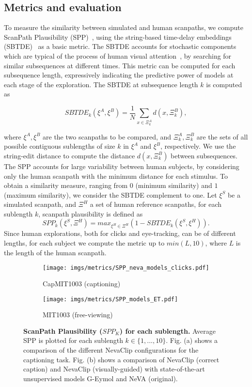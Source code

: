 \documentclass{article}
\begin{document}
\subsection{Metrics and evaluation}
To measure the similarity between simulated and human scanpaths, we compute ScanPath Plausibility (SPP)~\cite{fahimi2021metrics}, using the string-based time-delay embeddings (SBTDE)~\cite{schwinn2022behind} as a basic metric. The SBTDE accounts for stochastic components which are typical of the process of human visual attention~\cite{pang2010stochastic}, by searching for similar subsequences at different times. This metric can be computed for each subsequence length, expressively indicating the predictive power of models at each stage of the exploration. The SBTDE at subsequence length $k$ is computed as 

$$\textit{SBTDE}_k(\xi^{A}, \xi^{B}) = \frac{1}{N} \sum_{x \in \Xi^{A}_k} d(x, \Xi^{B}_k),$$

where $\xi^{A}, \xi^{B}$ are the two scanpaths to be compared, and $\Xi^{A}_k, \Xi^{B}_k$ are the sets of all possible contiguous sublengths of size $k$ in $\xi^{A}$ and $ \xi^{B}$, respectively. We use the string-edit distance to compute the distance $d(x, \Xi^{B}_k)$ between subsequences.
The SPP accounts for large variability between human subjects, by considering only the human scanpath with the minimum distance for each stimulus. To obtain a similarity measure, ranging from $0$ (minimum similarity) and $1$ (maximum similarity), we consider the SBTDE complement to one. Let $\xi^S$ be a simulated scanpath, and $\Xi^H$ a set of human reference scanpaths, for each sublength $k$, scanpath plausibility is defined as 
$$SPP_k(\xi^S, \Xi^H) = max_{\xi^H \in \Xi^H} \left( 1 - SBTDE_k(\xi^S, \xi^H)\right).$$
Since human explorations, both for clicks and eye-tracking, can be of different lengths, for each subject we compute the metric up to $min(L, 10)$, where $L$ is the length of the human scanpath.

\begin{figure}[t]
    \centering
    \begin{subfigure}{0.49\textwidth}
        \texttt{[image: imgs/metrics/SPP\_neva\_models\_clicks.pdf]}
        \caption{CapMIT1003 (captioning)}
        \label{fig:clicks}
    \end{subfigure}
    \hfill
    \begin{subfigure}{0.49\textwidth}
        \texttt{[image: imgs/metrics/SPP\_models\_ET.pdf]}
        \caption{MIT1003 (free-viewing)}\label{fig:et}
    \end{subfigure}
    \caption{\textbf{ScanPath Plausibility ($SPP_K$) for each sublength. }Average SPP is plotted for each sublength $k \in \{1, ..., 10\}$. Fig. (a) shows a comparison of the different NevaClip configurations for the captioning task. Fig. (b) shows a comparison of NevaClip (correct caption) and NevaClip (visually-guided) with state-of-the-art unsupervised models G-Eymol and NeVA (original). }
    \label{fig:metrics}
\end{figure}
\end{document}
